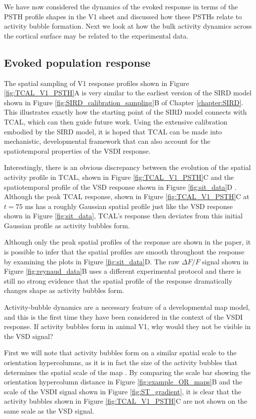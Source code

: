 \documentclass[phd,ianc,twoside]{infthesis}
\begin{document}
We have now considered the dynamics of the evoked response in terms of
the PSTH profile shapes in the V1 sheet and discussed how these PSTHs
relate to activity bubble formation. Next we look at how the bulk
activity dynamics across the cortical surface may be related to the
experimental data.


\subsection{Evoked population response}

The spatial sampling of V1 response profiles shown in Figure
\ref{fig:TCAL_V1_PSTH}A is very similar to the earliest version of the
SIRD model shown in Figure \ref{fig:SIRD_calibration_sampling}B of
Chapter \ref{chapter:SIRD}. This illustrates exactly how the starting
point of the SIRD model connects with TCAL, which can then guide future
work. Using the extensive calibration embodied by the SIRD model, it is
hoped that TCAL can be made into mechanistic, developmental framework
that can also account for the spatiotemporal properties of the VSDI
response.

Interestingly, there is an obvious discrepancy between the evolution of
the spatial activity profile in TCAL, shown in Figure
\ref{fig:TCAL_V1_PSTH}C and the spatiotemporal profile of the VSD
response shown in Figure \ref{fig:sit_data}D
\citep{sit_neuron09}. Although the peak TCAL response, shown in Figure
\ref{fig:TCAL_V1_PSTH}C at $t=75$ \si{\ms} has a roughly Gaussian
spatial profile just like the VSD response shown in Figure
\ref{fig:sit_data}, TCAL's response then deviates from this initial
Gaussian profile as activity bubbles form.

Although only the peak spatial profiles of the response are shown in the
\citet{sit_neuron09} paper, it is possible to infer that the spatial
profiles are smooth throughout the response by examining the plots in
Figure \ref{fig:sit_data}D. The raw $\Delta F/F$ signal shown in Figure
\ref{fig:reynaud_data}B uses a different experimental protocol and there
is still no strong evidence that the spatial profile of the response
dramatically changes shape as activity bubbles form.

Activity-bubble dynamics are a necessary feature of a developmental map
model, and this is the first time they have been considered in the
context of the VSDI response. If activity bubbles form in animal V1,
why would they not be visible in the VSD signal?

First we will note that activity bubbles form on a similar spatial scale
to the orientation hypercolumns, as it is in fact the size of the activity bubbles
that determines the spatial scale of the map \citep{miikkulainen_2005}. By
comparing the scale bar showing the orientation hypercolumn distance in
Figure \ref{fig:example_OR_maps}B and the scale of the VSDI signal shown
in Figure \ref{fig:ST_gradient}, it is clear that the activity bubbles
shown in Figure \ref{fig:TCAL_V1_PSTH}C are not shown on the same scale
as the VSD signal.
\end{document}
